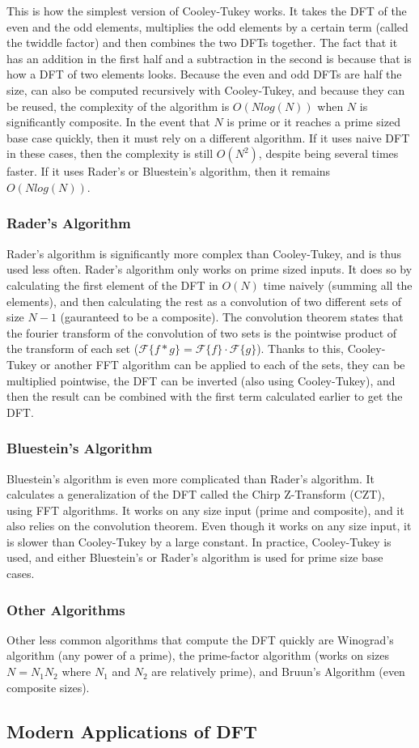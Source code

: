 		This is how the simplest version of Cooley-Tukey works. It takes the DFT of the even and the odd elements, multiplies the odd elements by a certain term (called the twiddle factor) and then combines the two DFTs together. The fact that it has an addition in the first half and a subtraction in the second is because that is how a DFT of two elements looks. Because the even and odd DFTs are half the size, can also be computed recursively with Cooley-Tukey, and because they can be reused, the complexity of the algorithm is $O(Nlog(N))$ when $N$ is significantly composite. In the event that $N$ is prime or it reaches a prime sized base case quickly, then it must rely on a different algorithm. If it uses naive DFT in these cases, then the complexity is still $O(N^2)$, despite being several times faster. If it uses Rader's or Bluestein's algorithm, then it remains $O(Nlog(N))$.
	\subsubsection{Rader's Algorithm}
		Rader's algorithm is significantly more complex than Cooley-Tukey, and is thus used less often. Rader's algorithm only works on prime sized inputs. It does so by calculating the first element of the DFT in $O(N)$ time naively (summing all the elements), and then calculating the rest as a convolution of two different sets of size $N-1$ (gauranteed to be a composite). The convolution theorem states that the fourier transform of the convolution of two sets is the pointwise product of the transform of each set ($\mathcal{F}\{f*g\}=\mathcal{F}\{f\}\cdot\mathcal{F}\{g\}$). Thanks to this, Cooley-Tukey or another FFT algorithm can be applied to each of the sets, they can be multiplied pointwise, the DFT can be inverted (also using Cooley-Tukey), and then the result can be combined with the first term calculated earlier to get the DFT.
	\subsubsection{Bluestein's Algorithm}
		Bluestein's algorithm is even more complicated than Rader's algorithm. It calculates a generalization of the DFT called the Chirp Z-Transform (CZT), using FFT algorithms. It works on any size input (prime and composite), and it also relies on the convolution theorem. Even though it works on any size input, it is slower than Cooley-Tukey by a large constant. In practice, Cooley-Tukey is used, and either Bluestein's or Rader's algorithm is used for prime size base cases.
	\subsubsection{Other Algorithms}
		Other less common algorithms that compute the DFT quickly are Winograd's algorithm (any power of a prime), the prime-factor algorithm (works on sizes $N=N_1N_2$ where $N_1$ and $N_2$ are relatively prime), and Bruun's Algorithm (even composite sizes).
\subsection{Modern Applications of DFT}
